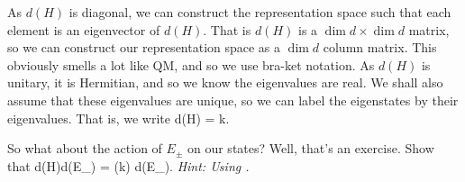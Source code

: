 As $d(H)$ is diagonal, we can construct the representation space such that each element is an eigenvector of $d(H)$. That is $d(H)$ is a $\dim d\times \dim d$ matrix, so we can construct our representation space as a $\dim d$ column matrix. This obviously smells a lot like QM, and so we use bra-ket notation. As $d(H)$ is unitary, it is Hermitian, and so we know the eigenvalues are real. We shall also assume that these eigenvalues are unique, so we can label the eigenstates by their eigenvalues. That is, we write 
\be  
\label{eqn:dHket(k)}
    d(H) = k.
\ee 

So what about the action of $E_{\pm}$ on our states? Well, that's an exercise. 
\bbox 
    Show that 
    \bse 
        d(H)d(E_{\pm}) = (k) d(E_{\pm}).
    \ese 
    \textit{Hint: Using .}
\ebox 

